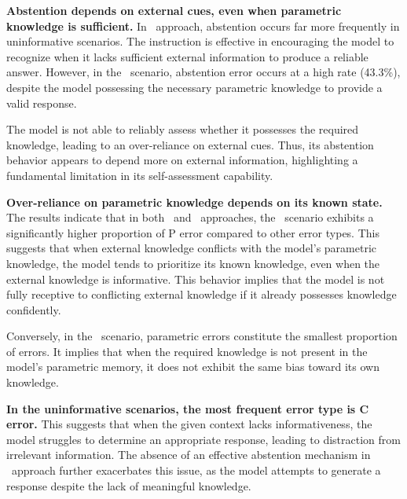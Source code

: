 \textbf{Abstention depends on external cues, even when parametric knowledge is sufficient.}
In \absinst\ approach, abstention occurs far more frequently in uninformative scenarios.
The instruction is effective in encouraging the model to recognize when it lacks sufficient external information to produce a reliable answer.
However, in the \KU\ scenario, abstention error occurs at a high rate (43.3\%), despite the model possessing the necessary parametric knowledge to provide a valid response.


The model is not able to reliably assess whether it possesses the required knowledge, leading to an over-reliance on external cues.
Thus, its abstention behavior appears to depend more on external information, highlighting a fundamental limitation in its self-assessment capability.



\textbf{Over-reliance on parametric knowledge depends on its known state.}
The results indicate that in both \naive\ and \absinst\ approaches, the \KI\ scenario exhibits a significantly higher proportion of P error compared to other error types.
This suggests that when external knowledge conflicts with the model's parametric knowledge, the model tends to prioritize its known knowledge, even when the external knowledge is informative.
This behavior implies that the model is not fully receptive to conflicting external knowledge if it already possesses knowledge confidently.


Conversely, in the \UI\ scenario, parametric errors constitute the smallest proportion of errors.
It implies that when the required knowledge is not present in the model's parametric memory, it does not exhibit the same bias toward its own knowledge.



\textbf{In the uninformative scenarios, the most frequent error type is C error.}
This suggests that when the given context lacks informativeness, the model struggles to determine an appropriate response, leading to distraction from irrelevant information.
The absence of an effective abstention mechanism in \naive\ approach further exacerbates this issue, as the model attempts to generate a response despite the lack of meaningful knowledge.




